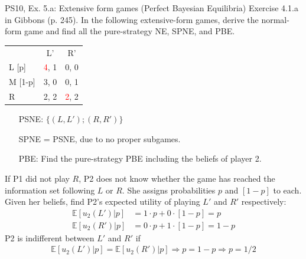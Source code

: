 \begin{frame}{PS10, Ex. 5.a: Extensive form games (Perfect Bayesian Equilibria)}
    Exercise 4.1.a in Gibbons (p. 245). In the following extensive-form games, derive the normal-form game and find all the pure-strategy NE, SPNE, and PBE.
    \vspace{-8pt}
    \begin{multicols}{2}
      \begin{table}
        \begin{tabular}{l|c|c|}
          \multicolumn{1}{c}{} & \multicolumn{1}{c}{L'} & \multicolumn{1}{c}{R'} \\\cline{2-3}
          L [p]   & \textcolor{red}{4}, \color{blue}1 & 0, 0 \\\cline{2-3}
          M [1-p] & 3, 0 & 0, \color{blue}1 \\\cline{2-3}
          R       & 2, \color{blue}2 & \textcolor{red}{2}, \color{blue}2 \\\cline{2-3}
        \end{tabular}
      \end{table} \vspace{-6pt}
      \begin{itemize}
        \item[PSNE:] $\{(L,L');(R,R')\}$
        \item[SPNE =] PSNE, due to no proper subgames.
        \item[PBE:] Find the pure-strategy PBE including the beliefs of player 2.
      \end{itemize} \vspace{-4pt}
      If P1 did not play $R$, P2 does not know whether the game has reached the information set following $L$ or $R$. She assigns probabilities $p$ and $[1-p]$ to each.\\\smallskip
      Given her beliefs, find P2's expected utility of playing $L'$ and $R'$ respectively: \vspace{-4pt}
      \begin{align*}
        \mathbb{E}[u_2(L')|p]&=1\cdot p+0\cdot[1-p]=p\\
        \mathbb{E}[u_2(R')|p]&=0\cdot p+1\cdot[1-p]=1-p
      \end{align*}
      P2 is indifferent between $L'$ and $R'$ if \vspace{-4pt}
      \begin{align*}
        \mathbb{E}[u_2(L')|p]=\mathbb{E}[u_2(R')|p]\Rightarrow p=1-p\Rightarrow p=1/2
      \end{align*}

\end{multicols}
\end{frame}
